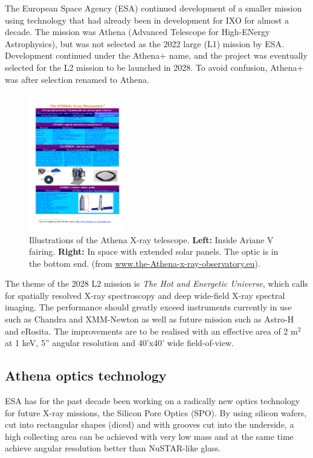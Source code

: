 The European Space Agency (ESA) continued development of a smaller mission using technology that had already been in development for IXO for almost a decade. The mission was Athena (Advanced Telescope for High-ENergy Astrophysics)\cite{Barcons:2012va}, but was not selected as the 2022 large (L1) mission by ESA. Development continued under the Athena+ name, and the project was eventually selected for the L2 mission to be launched in 2028. To avoid confusion, Athena+ was after selection renamed to Athena.

\begin{figure}[!h]
  \center
  \includegraphics[height=6cm]{figures/athena/athena_telescope.pdf}
\caption{\footnotesize Illustrations of the Athena X-ray telescope. \textbf{Left:} Inside Ariane V fairing. \textbf{Right:} In space with extended solar panels. The optic is in the bottom end. (from \url{www.the-Athena-x-ray-observatory.eu}).}\label{fig:Athena_telescope}
\end{figure}

The theme of the 2028 L2 mission is \emph{The Hot and Energetic Universe}, which calls for spatially resolved X-ray spectroscopy and deep wide-field X-ray spectral imaging. The performance should greatly exceed instruments currently in use such as Chandra and XMM-Newton as well as future mission such as Astro-H and eRosita. The improvements are to be realised with an effective area of 2 m$^2$ at 1 keV, 5'' angular resolution and 40'x40' wide field-of-view\cite{Willingale:2013vo}.

\subsection{Athena optics technology}\label{sec:Athena_opt_tech}
ESA has for the past decade been working on a radically new optics technology for future X-ray missions, the Silicon Pore Optics (SPO)\cite{Barcons:2012va,Collon:2010bp,Collon:2006ky,Collon:2010bp,Collon:2006ky,Beijersbergen:2004cc}. By using silicon wafers, cut into rectangular shapes (diced) and with grooves cut into the underside, a high collecting area can be achieved with very low mass and at the same time achieve angular resolution better than NuSTAR-like glass.

